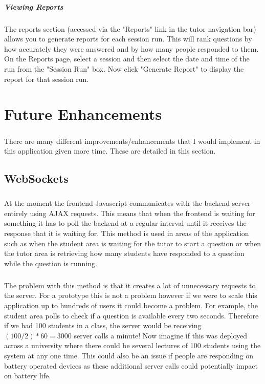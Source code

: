 \documentclass[10pt]{report}
\begin{document}
	\paragraph*{Viewing Reports}
	The reports section (accessed via the "Reports" link in the tutor navigation bar) allows you to
	generate reports for each session run.  This will rank questions by how accurately they were answered
	and by how many people responded to them.  On the Reports page, select a session and then select the
	date and time of the run from the "Session Run" box.  Now click "Generate Report" to display the
	report for that session run.
    
    \chapter*{Future Enhancements}
    \paragraph{}
    There are many different improvements/enhancements that I would implement in this application given
    more time.  These are detailed in this section.
    
    \section*{WebSockets}
    \paragraph{}
    At the moment the frontend Javascript communicates with the backend server entirely using AJAX
    requests.  This means that when the frontend is waiting for something it has to poll the backend at a
    regular interval until it receives the response that it is waiting for. This method is used in areas
    of the application such as when the student area is waiting for the tutor to start a question or when
    the tutor area is retrieving how many students have responded to a question while the question is
    running.
    
    \paragraph{}
    The problem with this method is that it creates a lot of unnecessary requests to the server.  For a
    prototype this is not a problem however if we were to scale this application up to hundreds of users
    it could become a problem.  For example, the student area polls to check if a question is available
    every two seconds.  Therefore if we had 100 students in a class, the server would be receiving
    $(100/2)*60=3000$ server calls a minute!  Now imagine if this was deployed across a university where
    there could be several lectures of 100 students using the system at any one time.  This could also be
    an issue if people are responding on battery operated devices as these additional server calls could
    potentially impact on battery life.
    
\end{document}

